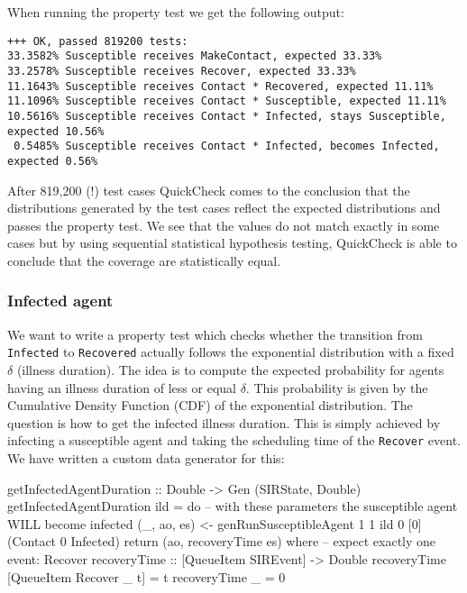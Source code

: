 When running the property test we get the following output:

\begin{footnotesize}
\begin{verbatim}
+++ OK, passed 819200 tests:
33.3582% Susceptible receives MakeContact, expected 33.33%
33.2578% Susceptible receives Recover, expected 33.33%
11.1643% Susceptible receives Contact * Recovered, expected 11.11%
11.1096% Susceptible receives Contact * Susceptible, expected 11.11%
10.5616% Susceptible receives Contact * Infected, stays Susceptible, expected 10.56%
 0.5485% Susceptible receives Contact * Infected, becomes Infected, expected 0.56%
\end{verbatim}
\end{footnotesize}

After 819,200 (!) test cases QuickCheck comes to the conclusion that the distributions generated by the test cases reflect the expected distributions and passes the property test. We see that the values do not match exactly in some cases but by using sequential statistical hypothesis testing, QuickCheck is able to conclude that the coverage are statistically equal.

\subsubsection{Infected agent}
We want to write a property test which checks whether the transition from \texttt{Infected} to \texttt{Recovered} actually follows the exponential distribution with a fixed $\delta$ (illness duration). The idea is to compute the expected probability for agents having an illness duration of less or equal $\delta$. This probability is given by the Cumulative Density Function (CDF) of the exponential distribution. The question is how to get the infected illness duration. This is simply achieved by infecting a susceptible agent and taking the scheduling time of the \texttt{Recover} event. We have written a custom data generator for this:

\begin{HaskellCode}
getInfectedAgentDuration :: Double -> Gen (SIRState, Double)
getInfectedAgentDuration ild = do
  -- with these parameters the susceptible agent WILL become infected
  (_, ao, es) <- genRunSusceptibleAgent 1 1 ild 0 [0] (Contact 0 Infected)
  return (ao, recoveryTime es)
  where
    -- expect exactly one event: Recover
    recoveryTime :: [QueueItem SIREvent] -> Double
    recoveryTime [QueueItem Recover _ t]  = t
    recoveryTime _ = 0
\end{HaskellCode}

